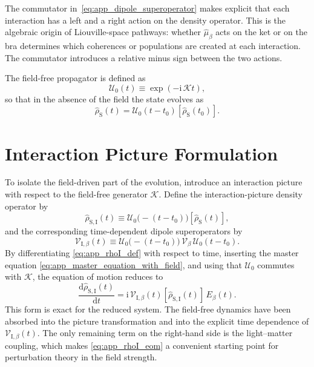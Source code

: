 The commutator in~\autoref{eq:app_dipole_superoperator} makes explicit that each interaction has a left and a right action on the density operator. This is the algebraic origin of Liouville-space pathways: whether $\hat{\mu}_{\beta}$ acts on the ket or on the bra determines which coherences or populations are created at each interaction. The commutator introduces a relative minus sign between the two actions.

The field-free propagator is defined as
\begin{equation*}
	\mathcal{U}_0(t) \equiv \exp(-\mathrm{i}\,\mathcal{K}t),
\end{equation*}
so that in the absence of the field the state evolves as
\begin{equation*}
	\hat{\rho}_{\mathrm{S}}(t)=\mathcal{U}_0(t-t_0)[\hat{\rho}_{\mathrm{S}}(t_0)].
\end{equation*}

\section{Interaction Picture Formulation}
\label{app:sec:interaction_picture_K}

To isolate the field-driven part of the evolution, introduce an interaction picture with respect to the field-free generator $\mathcal{K}$. Define the interaction-picture density operator by
\begin{equation}
	\hat{\rho}_{\mathrm{S,I}}(t)
	\equiv \mathcal{U}_0\!\bigl(-(t-t_0)\bigr)[\hat{\rho}_{\mathrm{S}}(t)],
	\label{eq:app_rhoI_def}
\end{equation}
and the corresponding time-dependent dipole superoperators by
\begin{equation}
	\mathcal{V}_{\mathrm I,\beta}(t)
	\equiv \mathcal{U}_0\!\bigl(-(t-t_0)\bigr)\,\mathcal{V}_{\beta}\,\mathcal{U}_0(t-t_0).
	\label{eq:dipole_super_op_interaction_pic}
\end{equation}
By differentiating \autoref{eq:app_rhoI_def} with respect to time, inserting the master equation \autoref{eq:app_master_equation_with_field}, and using that $\mathcal{U}_0$ commutes with $\mathcal{K}$, the equation of motion reduces to
\begin{equation}
	\frac{\mathrm{d}\hat{\rho}_{\mathrm{S,I}}(t)}{\mathrm{d}t}
	= \mathrm{i}\,\mathcal{V}_{\mathrm I,\beta}(t)[\hat{\rho}_{\mathrm{S,I}}(t)]\,E_{\beta}(t).
	\label{eq:app_rhoI_eom}
\end{equation}
This form is exact for the reduced system. The field-free dynamics have been absorbed into the picture transformation and into the explicit time dependence of $\mathcal{V}_{\mathrm I,\beta}(t)$. The only remaining term on the right-hand side is the light--matter coupling, which makes \autoref{eq:app_rhoI_eom} a convenient starting point for perturbation theory in the field strength.

